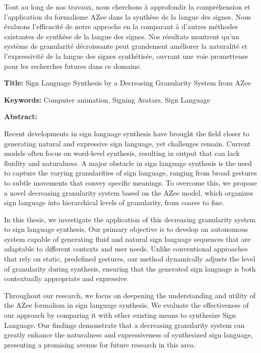 \documentclass[english,12pt,a4paper]{book}
\begin{document}
\begin{mdframed}[linecolor=Prune,linewidth=1]
\begin{multicols}{2}
Tout au long de nos travaux, nous cherchons à approfondir la compréhension et l'application du formalisme AZee dans la synthèse de la langue des signes. Nous évaluons l'efficacité de notre approche en la comparant à d'autres méthodes existantes de synthèse de la langue des signes. Nos résultats montrent qu'un système de granularité décroissante peut grandement améliorer la naturalité et l'expressivité de la langue des signes synthétisée, ouvrant une voie prometteuse pour les recherches futures dans ce domaine.
\end{multicols}

\end{mdframed}

\newpage

\vspace{8mm}

\begin{mdframed}[linecolor=Prune,linewidth=1]

\textbf{Title:} Sign Language Synthesis by a Decreasing Granularity System from AZee

\noindent \textbf{Keywords:} Computer animation, Signing Avatars, Sign Language

\begin{multicols}{2}
\noindent \textbf{Abstract:}

Recent developments in sign language synthesis have brought the field closer to generating natural and expressive sign language, yet challenges remain. Current models often focus on word-level synthesis, resulting in output that can lack fluidity and naturalness. A major obstacle in sign language synthesis is the need to capture the varying granularities of sign language, ranging from broad gestures to subtle movements that convey specific meanings. To overcome this, we propose a novel decreasing granularity system based on the AZee model, which organizes sign language into hierarchical levels of granularity, from coarse to fine.

In this thesis, we investigate the application of this decreasing granularity system to sign language synthesis. Our primary objective is to develop an autonomous system capable of generating fluid and natural sign language sequences that are adaptable to different contexts and user needs. Unlike conventional approaches that rely on static, predefined gestures, our method dynamically adjusts the level of granularity during synthesis, ensuring that the generated sign language is both contextually appropriate and expressive.

Throughout our research, we focus on deepening the understanding and utility of the AZee formalism in sign language synthesis. We evaluate the effectiveness of our approach by comparing it with other existing means to synthesize Sign Language. Our findings demonstrate that a decreasing granularity system can greatly enhance the naturalness and expressiveness of synthesized sign language, presenting a promising avenue for future research in this area.

\end{multicols}
\end{mdframed}
\end{document}

